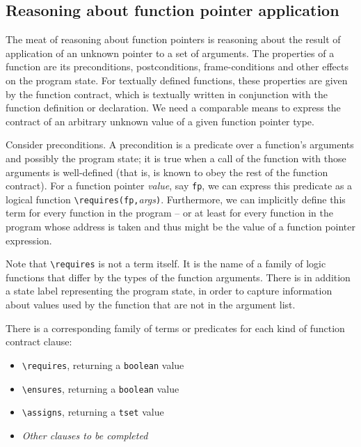 \subsection{Reasoning about function pointer application}
\label{sec:fpreasoning}
The meat of reasoning about function pointers is reasoning about the result of application of an unknown pointer to a set of arguments. 
The properties of a function are its
preconditions, postconditions, frame-conditions and other effects on the program state. 
For textually defined functions, these properties are given by 
the function contract, which is textually written in
conjunction with the function definition or declaration.
We need a comparable means to express the contract of an
arbitrary unknown value of a given function pointer type.

Consider preconditions. 
A precondition is a predicate over a
function's arguments and possibly the program state; it is 
true when a call of the function with those arguments is 
well-defined (that is, is known to obey the rest of the function contract). 
For a function pointer \emph{value}, say \lstinline|fp|, we can express this predicate as a logical function
\lstinline|\requires(fp,|\emph{args}\lstinline|)|. 
Furthermore, we can implicitly define this term for every function in the program -- or at least for every function in the program whose address is taken and thus might be the value of a function pointer expression.

Note that \lstinline|\requires| is not a term itself. It is the name of a family of logic functions that differ by the types of the function arguments. There is in addition a state label representing the program state, in order to capture
information about values used by the function that are not in
the argument list. 

There is a corresponding family of terms or predicates for each kind of function contract clause:
\begin{itemize}[noitemsep,nolistsep]
	\item \lstinline|\requires|, returning a \lstinline|boolean| value
	\item \lstinline|\ensures|, returning a \lstinline|boolean| value
	\item\lstinline|\assigns|, returning a \lstinline|tset| value
	\item \textit{Other clauses to be completed} 
\end{itemize}

